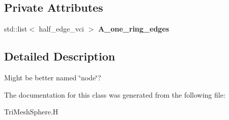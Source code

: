 \subsection*{Private Attributes}
\begin{CompactItemize}
\item 
std::list$<$ half\_\-edge\_\-vci $>$ \textbf{A\_\-one\_\-ring\_\-edges}\label{classASCbase_1_1geometry_1_1vertex__t_9d8c7fb281ada6fd0369cda6007d3f55}

\end{CompactItemize}


\subsection{Detailed Description}
Might be better named \char`\"{}node\char`\"{}? 



The documentation for this class was generated from the following file:\begin{CompactItemize}
\item 
Tri\-Mesh\-Sphere.H\end{CompactItemize}
